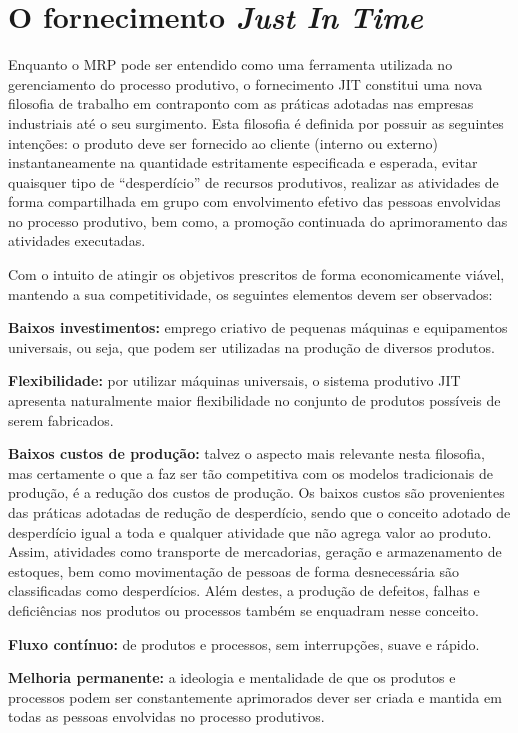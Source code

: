 \chapter{O fornecimento \textit{Just In Time}}
\label{chap:fornecimento_just_in_time}

Enquanto o \ac{MRP} pode ser entendido como uma ferramenta utilizada no gerenciamento do processo produtivo, o fornecimento \ac{JIT} constitui uma nova filosofia de trabalho em contraponto com as práticas adotadas nas empresas industriais até o seu surgimento. Esta filosofia é definida por possuir as seguintes intenções: o produto deve ser fornecido ao cliente (interno ou externo) instantaneamente na quantidade estritamente especificada e esperada, evitar quaisquer tipo de ``desperdício'' de recursos produtivos, realizar as atividades de forma compartilhada em grupo com envolvimento efetivo das pessoas envolvidas no processo produtivo, bem como, a promoção continuada do aprimoramento das atividades executadas.

Com o intuito de atingir os objetivos prescritos de forma economicamente viável, mantendo a sua competitividade, os seguintes elementos devem ser observados:

\textbf{Baixos investimentos:} emprego criativo de pequenas máquinas e equipamentos universais, ou seja, que podem ser utilizadas na produção de diversos produtos.

\textbf{Flexibilidade:} por utilizar máquinas universais, o sistema produtivo \ac{JIT} apresenta naturalmente maior flexibilidade no conjunto de produtos possíveis de serem fabricados.

\textbf{Baixos custos de produção:} talvez o aspecto mais relevante nesta filosofia, mas certamente o que a faz ser tão competitiva com os modelos tradicionais de produção, é a redução dos custos de produção. Os baixos custos são provenientes das práticas adotadas de redução de desperdício, sendo que o conceito adotado de desperdício igual a toda e qualquer atividade que não agrega valor ao produto. Assim, atividades como transporte de mercadorias, geração e armazenamento de estoques, bem como movimentação de pessoas de forma desnecessária são classificadas como desperdícios. Além destes, a produção de defeitos, falhas e deficiências nos produtos ou processos também se enquadram nesse conceito.

\textbf{Fluxo contínuo:} de produtos e processos, sem interrupções, suave e rápido.

\textbf{Melhoria permanente:} a ideologia e mentalidade de que os produtos e processos podem ser constantemente aprimorados dever ser criada e mantida em todas as pessoas envolvidas no processo produtivos.

